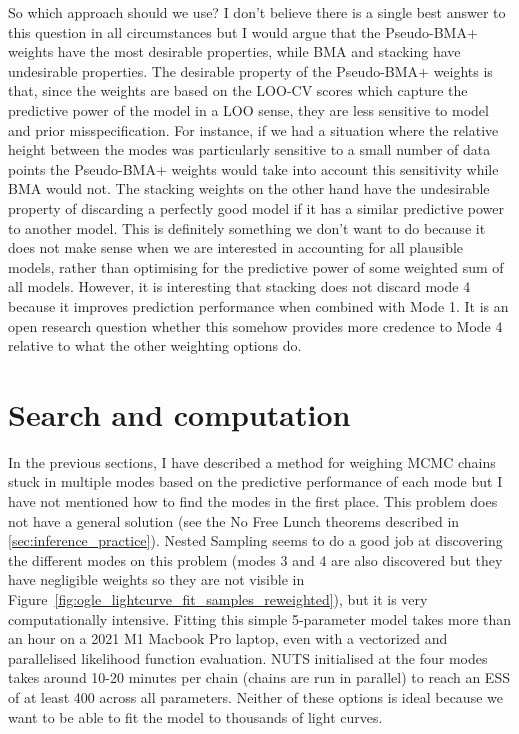 \documentclass[12pt,dvipsnames]{report}
\begin{document}
So which approach should we use? I don't believe there is a single best answer 
to this question in all circumstances but I would argue that the Pseudo-BMA+ weights 
have the most desirable properties, while BMA and stacking have undesirable properties.
The desirable property of the Pseudo-BMA+ weights is that, since the weights are based 
on the LOO-CV scores which capture the predictive power of the model in a LOO sense, 
they are less sensitive to model and prior misspecification. For instance, if we 
had a situation where the relative height between the modes was 
particularly sensitive to a small number of data points the Pseudo-BMA+ weights 
would take into account this sensitivity while BMA would not.
The stacking weights on the other hand have the undesirable property of discarding
a perfectly good model if it has a similar predictive power to another model. This is 
definitely something we don't want to do because it does not make sense when we 
are interested in accounting for all plausible models, rather than optimising for 
the predictive power of some weighted sum of all models. However, it is interesting 
that stacking does not discard mode 4 because it improves prediction performance 
when combined with Mode 1. It is an open research question whether this somehow provides 
more credence to Mode 4 relative to what the other weighting options do.

\section{Search and computation}
\label{sec:search_and_computation}
In the previous sections, I have described a method for weighing MCMC chains stuck 
in multiple modes based on the predictive performance of each mode but I have not
mentioned how to find the modes in the first place. This problem does not have a general
solution (see the No Free Lunch theorems described in \ref{sec:inference_practice}). 
Nested Sampling seems to do a good job at discovering the different modes on this 
problem (modes 3 and 4 are also discovered but they have negligible weights so they 
are not visible in Figure~\ref{fig:ogle_lightcurve_fit_samples_reweighted}), but it is 
very computationally intensive. Fitting this simple 5-parameter model takes more 
than an hour on a 2021 M1 Macbook Pro laptop, even with a vectorized and 
parallelised likelihood function evaluation. NUTS initialised at the four modes takes 
around 10-20 minutes per chain (chains are run in parallel) to reach an ESS of at least 
400 across all parameters. Neither of these options is ideal because we want to be able 
to fit the model to thousands of light curves.
\end{document}
